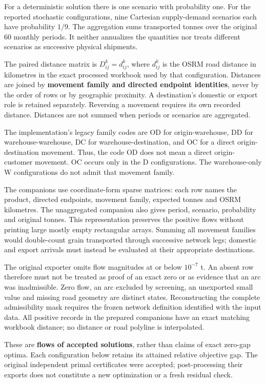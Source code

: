 \documentclass[
  english,
  11pt,
  a4paper,
]{article}
\begin{document}
For a deterministic solution there is one scenario with probability one.
For the reported stochastic configurations, nine Cartesian supply-demand
scenarios each have probability \(1/9\). The aggregation sums
transported tonnes over the original 60 monthly periods. It neither
annualizes the quantities nor treats different scenarios as successive
physical shipments.

The paired distance matrix is \(D^k_{ij}=d^k_{ij}\), where \(d^k_{ij}\)
is the OSRM road distance in kilometres in the exact processed workbook
used by that configuration. Distances are joined by \textbf{movement
family and directed endpoint identities}, never by the order of rows or
by geographic proximity. A destination's domestic or export role is
retained separately. Reversing a movement requires its own recorded
distance. Distances are not summed when periods or scenarios are
aggregated.

The implementation's legacy family codes are OD for origin-warehouse, DD
for warehouse-warehouse, DC for warehouse-destination, and OC for a
direct origin-destination movement. Thus, the code OD does not mean a
direct origin-customer movement. OC occurs only in the D configurations.
The warehouse-only W configurations do not admit that movement family.

The companions use coordinate-form sparse matrices: each row names the
product, directed endpoints, movement family, expected tonnes and OSRM
kilometres. The unaggregated companion also gives period, scenario,
probability and original tonnes. This representation preserves the
positive flows without printing large mostly empty rectangular arrays.
Summing all movement families would double-count grain transported
through successive network legs; domestic and export arrivals must
instead be evaluated at their appropriate destinations.

The original exporter omits flow magnitudes at or below \(10^{-7}\) t.
An absent row therefore must not be treated as proof of an exact zero or
as evidence that an arc was inadmissible. Zero flow, an arc excluded by
screening, an unexported small value and missing road geometry are
distinct states. Reconstructing the complete admissibility mask requires
the frozen network definition identified with the input data. All
positive records in the prepared companions have an exact matching
workbook distance; no distance or road polyline is interpolated.

These are \textbf{flows of accepted solutions}, rather than claims of
exact zero-gap optima. Each configuration below retains its attained
relative objective gap. The original independent primal certificates
were accepted; post-processing their exports does not constitute a new
optimization or a fresh residual check.
\end{document}
